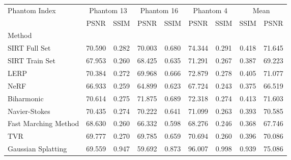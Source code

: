 \begin{tabular}{|l|cc|cc|cc|cc|}
\toprule
Phantom Index & \multicolumn{2}{c|}{Phantom 13} & \multicolumn{2}{c|}{Phantom 16} & \multicolumn{2}{c|}{Phantom 4} & \multicolumn{2}{c|}{Mean} \\
 & PSNR & SSIM & PSNR & SSIM & PSNR & SSIM & SSIM & PSNR \\
Method &  &  &  &  &  &  &  &  \\
\midrule
SIRT Full Set & 70.590 & 0.282 & 70.003 & 0.680 & 74.344 & 0.291 & 0.418 & 71.645 \\
SIRT Train Set & 67.953 & 0.260 & 68.425 & 0.635 & 71.291 & 0.267 & 0.387 & 69.223 \\
LERP & \cellcolor{rankthird}70.384 & 0.272 & \cellcolor{rankthird}69.968 & \cellcolor{rankthird}0.666 & \cellcolor{ranksecond}72.879 & \cellcolor{ranksecond}0.278 & \cellcolor{rankthird}0.405 & \cellcolor{rankthird}71.077 \\
NeRF & \cellcolor{rankworst}66.933 & \cellcolor{rankworst}0.259 & 64.899 & 0.623 & \cellcolor{rankworst}67.724 & \cellcolor{rankworst}0.243 & 0.375 & \cellcolor{rankworst}66.519 \\
Biharmonic & \cellcolor{rankfirst}70.614 & \cellcolor{ranksecond}0.275 & \cellcolor{rankfirst}71.875 & \cellcolor{ranksecond}0.689 & \cellcolor{rankthird}72.318 & \cellcolor{rankthird}0.274 & \cellcolor{ranksecond}0.413 & \cellcolor{ranksecond}71.603 \\
Navier-Stokes & \cellcolor{ranksecond}70.435 & \cellcolor{rankthird}0.274 & \cellcolor{ranksecond}70.222 & 0.641 & 71.099 & 0.263 & 0.393 & 70.585 \\
Fast Marching Method & 68.630 & 0.260 & 66.332 & \cellcolor{rankworst}0.598 & 68.276 & 0.246 & \cellcolor{rankworst}0.368 & 67.746 \\
TVR & 69.777 & 0.270 & 69.785 & 0.659 & 70.694 & 0.260 & 0.396 & 70.086 \\
Gaussian Splatting & 69.559 & \cellcolor{rankfirst}0.947 & \cellcolor{rankworst}59.692 & \cellcolor{rankfirst}0.873 & \cellcolor{rankfirst}96.007 & \cellcolor{rankfirst}0.998 & \cellcolor{rankfirst}0.939 & \cellcolor{rankfirst}75.086 \\
\bottomrule
\end{tabular}
